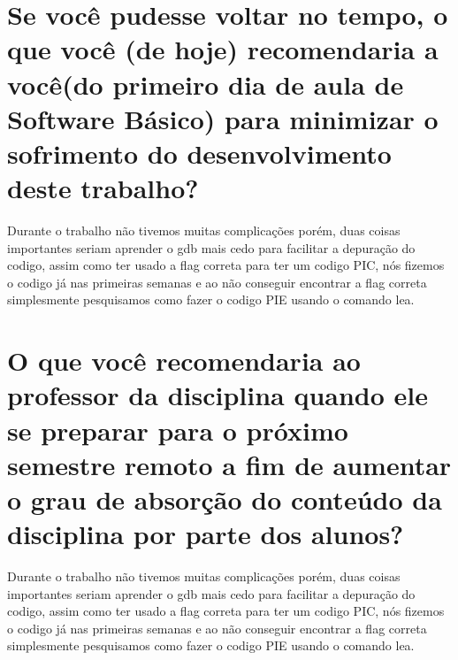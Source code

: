 \documentclass[12pt]{article}
\begin{document}
\section{Se você pudesse voltar no tempo, o que você (de hoje) recomendaria a você(do primeiro dia de aula de Software Básico) para minimizar o sofrimento do desenvolvimento deste trabalho?}
    Durante o trabalho não tivemos muitas complicações porém, duas coisas importantes seriam aprender o gdb mais cedo para facilitar a depuração do codigo,
    assim como ter usado a flag correta para ter um codigo PIC, nós fizemos o codigo já nas primeiras semanas e ao não conseguir encontrar a flag correta simplesmente 
    pesquisamos como fazer o codigo PIE usando o comando lea.

\section{O que você recomendaria ao professor da disciplina quando ele se preparar para o próximo semestre remoto a fim de aumentar o grau de absorção do conteúdo da disciplina por parte dos alunos?}
    Durante o trabalho não tivemos muitas complicações porém, duas coisas importantes seriam aprender o gdb mais cedo para facilitar a depuração do codigo,
    assim como ter usado a flag correta para ter um codigo PIC, nós fizemos o codigo já nas primeiras semanas e ao não conseguir encontrar a flag correta simplesmente 
    pesquisamos como fazer o codigo PIE usando o comando lea.
\end{document}
